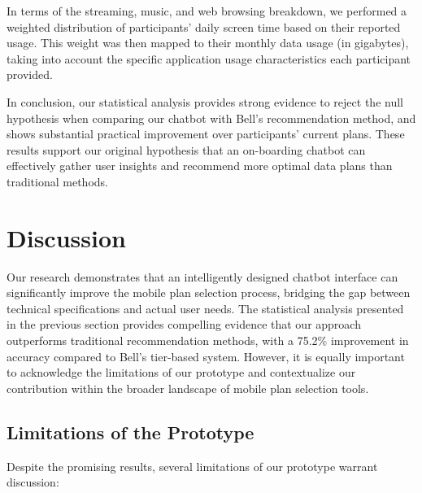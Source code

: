 \documentclass[conference]{IEEEtran}
\begin{document}
In terms of the streaming, music, and web browsing breakdown, we performed a weighted distribution of participants' daily screen time based on their reported usage. This weight was then mapped to their monthly data usage (in gigabytes), taking into account the specific application usage characteristics each participant provided.

In conclusion, our statistical analysis provides strong evidence to reject the null hypothesis when comparing our chatbot with Bell's recommendation method, and shows substantial practical improvement over participants' current plans. These results support our original hypothesis that an on-boarding chatbot can effectively gather user insights and recommend more optimal data plans than traditional methods.



\section{Discussion}

Our research demonstrates that an intelligently designed chatbot interface can significantly improve the mobile plan selection process, bridging the gap between technical specifications and actual user needs. The statistical analysis presented in the previous section provides compelling evidence that our approach outperforms traditional recommendation methods, with a 75.2\% improvement in accuracy compared to Bell's tier-based system. However, it is equally important to acknowledge the limitations of our prototype and contextualize our contribution within the broader landscape of mobile plan selection tools.

\subsection{Limitations of the Prototype}

Despite the promising results, several limitations of our prototype warrant discussion:
\end{document}
